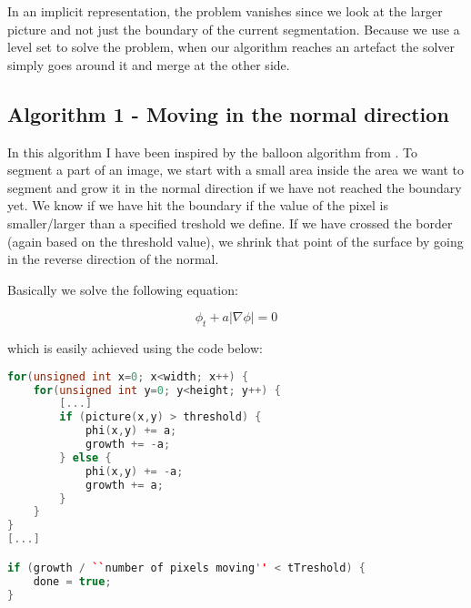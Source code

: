In an implicit representation, the problem vanishes since we look at
the larger picture and not just the boundary of the current
segmentation. Because we use a level set to solve the problem, when
our algorithm reaches an artefact the solver simply goes around it and
merge at the other side.

\subsection{Algorithm 1 - Moving in the normal direction}
\label{segmentation:sec:algorithm1}

\begin{comment}
Start med noget mere overordnet og gå derefter i detaljer.

Læs igennem så det ikke står spredt men samlet.

Indsæt afsnit hvor jeg går direkte i dybden og overvej at fjerne
ligning 1.1

\end{comment}

In this algorithm I have been inspired by the balloon algorithm from
.  To segment a part of an image, we start with a
small area inside the area we want to segment and grow it in the
normal direction if we have not reached the boundary yet. We know if
we have hit the boundary if the value of the pixel is smaller/larger
than a specified treshold we define. If we have crossed the border
(again based on the threshold value), we shrink that point of the
surface by going in the reverse direction of the normal.



Basically we solve the following equation:

\begin{equation}
  \phi_{t} + a|\nabla{\phi}| = 0
\end{equation}

which is easily achieved using the code below: 

\begin{listing}
\begin{lstlisting}[language=c++]
for(unsigned int x=0; x<width; x++) {
    for(unsigned int y=0; y<height; y++) {
        [...]
        if (picture(x,y) > threshold) {
            phi(x,y) += a;
            growth += -a;
        } else {
            phi(x,y) += -a;
            growth += a;
        }
    }
}
[...]

if (growth / ``number of pixels moving'' < tTreshold) {
    done = true;
}
\end{lstlisting}
\label{segmentation:code}
\end{listing}


